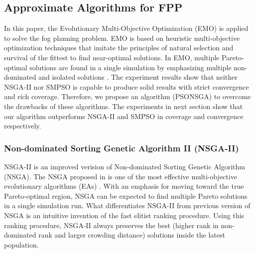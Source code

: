 \documentclass[10pt,journal,compsoc]{IEEEtran}
\begin{document}

\subsection{Approximate Algorithms for FPP}\label{sec:approximate}
In this paper, the Evolutionary Multi-Objective Optimization (EMO) is applied to solve the fog planning problem. EMO is based on heuristic multi-objective optimization techniques that imitate the principles of natural selection and survival of the fittest to find near-optimal solutions. In EMO, multiple Pareto-optimal solutions are found in a single simulation by emphasizing multiple non-dominated and isolated solutions \cite{Deb:2001:MOU:559152}. %
The experiment results show that neither NSGA-II nor SMPSO is capable to produce solid results with strict convergence and rich coverage. Therefore, we propose an algorithm (PSONSGA) to overcome the drawbacks of these algorithms. The experiments in next section show that our algorithm outperforms NSGA-II and SMPSO in coverage and convergence respectively.
\subsubsection{Non-dominated Sorting Genetic Algorithm II (NSGA-II)}
NSGA-II is an improved verision of Non-dominated Sorting Genetic Algorithm (NSGA). The NSGA proposed in \cite{Deb:2002:FEM:2221359.2221582} is one of the most effective multi-objective evolutionary algorithms (EAs) \cite{fonseca1993genetic, rey1994niched}. With an emphasis for moving toward the true Pareto-optimal region, NSGA can be expected to find multiple Pareto solutions in a single simulation run. What differentiates NSGA-II from previous version of NSGA is an intuitive invention of the fast elitist ranking procedure. Using this ranking procedure, NSGA-II always preserves the best (higher rank in non-dominated rank and larger crowding distance) solutions inside the latest population. 
\end{document}
